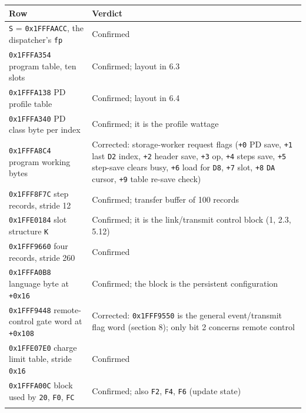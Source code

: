 {\def\LTcaptype{none} %
\begin{longtable}[]{@{}
  >{\raggedright\arraybackslash}p{}
  >{\raggedright\arraybackslash}p{}@{}}
\toprule\noalign{}
\begin{minipage}[b]{\linewidth}\raggedright
Row
\end{minipage} & \begin{minipage}[b]{\linewidth}\raggedright
Verdict
\end{minipage} \\
\midrule\noalign{}
\endhead
\bottomrule\noalign{}
\endlastfoot
\texttt{S} = \texttt{0x1FFFAACC}, the dispatcher's \texttt{fp} &
Confirmed \\
\texttt{0x1FFFA354} program table, ten slots & Confirmed; layout in
6.3 \\
\texttt{0x1FFFA138} PD profile table & Confirmed; layout in 6.4 \\
\texttt{0x1FFFA340} PD class byte per index & Confirmed; it is the
profile wattage \\
\texttt{0x1FFFA8C4} program working bytes & Corrected: storage-worker
request flags (\texttt{+0} PD save, \texttt{+1} last \texttt{D2} index,
\texttt{+2} header save, \texttt{+3} op, \texttt{+4} steps save,
\texttt{+5} step-save clears busy, \texttt{+6} load for \texttt{D8},
\texttt{+7} slot, \texttt{+8} \texttt{DA} cursor, \texttt{+9} table
re-save check) \\
\texttt{0x1FFF8F7C} step records, stride 12 & Confirmed; transfer buffer
of 100 records \\
\texttt{0x1FFE0184} slot structure \texttt{K} & Confirmed; it is the
link/transmit control block (1, 2.3, 5.12) \\
\texttt{0x1FFF9660} four records, stride 260 & Confirmed \\
\texttt{0x1FFFA0B8} language byte at \texttt{+0x16} & Confirmed; the
block is the persistent configuration \\
\texttt{0x1FFF9448} remote-control gate word at \texttt{+0x108} &
Corrected: \texttt{0x1FFF9550} is the general event/transmit flag word
(section 8); only bit 2 concerns remote control \\
\texttt{0x1FFE07E0} charge limit table, stride \texttt{0x16} &
Confirmed \\
\texttt{0x1FFFA00C} block used by \texttt{20}, \texttt{F0}, \texttt{FC}
& Confirmed; also \texttt{F2}, \texttt{F4}, \texttt{F6} (update
state) \\*
\end{longtable}
}

